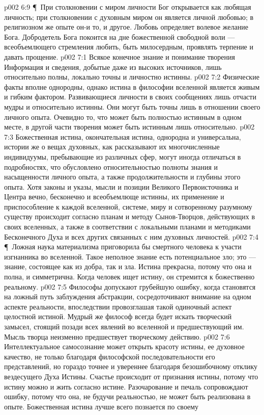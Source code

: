 \vs p002 6:9 \P\ При столкновении с миром личности Бог открывается как любящая личность; при столкновении с духовным миром он является личной любовью; в религиозном же опыте он\hyp{}и то, и другое. Любовь определяет волевое желание Бога. Добродетель Бога покоится на дне божественной свободной воли --- всеобъемлющего стремления любить, быть милосердным, проявлять терпение и давать прощение.
\vs p002 7:1 Всякое конечное знание и понимание творения  Информация и сведения, добытые даже из высоких источников, лишь относительно полны, локально точны и личностно истинны.
\vs p002 7:2 Физические факты вполне однородны, однако истина в философии вселенной является живым и гибким фактором. Развивающиеся личности в своих сообщениях лишь отчасти мудры и относительно истинны. Они могут быть точны лишь в отношении своего личного опыта. Очевидно то, что может быть полностью истинным в одном месте, в другой части творения может быть истинным лишь относительно.
\vs p002 7:3 Божественная истина, окончательная истина, однородна и универсальна, истории же о вещах духовных, как рассказывают их многочисленные индивидуумы, пребывающие из различных сфер, могут иногда отличаться в подробностях, что обусловлено относительностью полноты знания и насыщенности личного опыта, а также продолжительности и глубины этого опыта. Хотя законы и указы, мысли и позиции Великого Первоисточника и Центра вечно, бесконечно и всеобъемлюще истинны, их применение и приспособление к каждой вселенной, системе, миру и сотворенному разумному существу происходит согласно планам и методу Сынов\hyp{}Творцов, действующих в своих вселенных, а также в соответствии с локальными планами и методиками Бесконечного Духа и всех других связанных с ним духовных личностей.
\vs p002 7:4 \P\ Ложная наука материализма приговорила бы смертного человека к участи изгнанника во вселенной. Такое неполное знание есть потенциальное зло; это --- знание, состоящее как из добра, так и зла. Истина прекрасна, потому что она и полна, и симметрична. Когда человек ищет истину, он стремится к божественно реальному.
\vs p002 7:5 Философы допускают грубейшую ошибку, когда становятся на ложный путь заблуждения абстракции, сосредоточивают внимание на одном аспекте реальности, впоследствии провозглашая такой одиночный аспект целостной истиной. Мудрый же философ всегда будет искать творческий замысел, стоящий позади всех явлений во вселенной и предшествующий им. Мысль творца неизменно предшествует творческому действию.
\vs p002 7:6 Интеллектуальное самосознание может открыть красоту истины, ее духовное качество, не только благодаря философской последовательности его представлений, но гораздо точнее и увереннее благодаря безошибочному отклику вездесущего Духа Истины. Счастье происходит от признания истины, потому что истину можно  и жить согласно истине. Разочарование и печаль сопровождают ошибку, потому что она, не будучи реальностью, не может быть реализована в опыте. Божественная истина лучше всего познается по своему 
